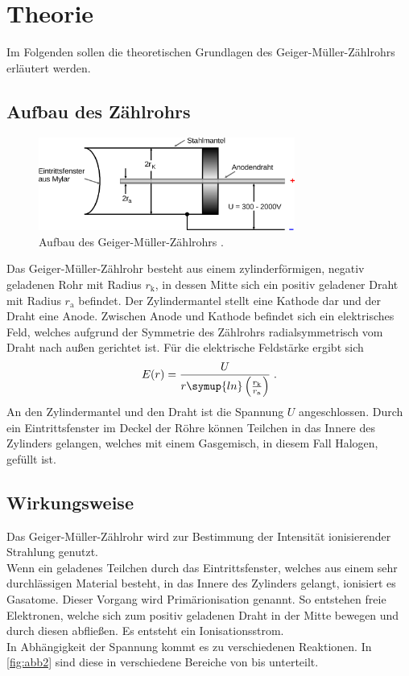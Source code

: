 \section{Theorie} \label{sec:Theorie}

Im Folgenden sollen die theoretischen Grundlagen des Geiger-Müller-Zählrohrs erläutert werden.

\subsection{Aufbau des Zählrohrs}

    \begin{figure}
      \centering
      \includegraphics[width=0.75\textwidth]{content/img/V703_Abb1.jpg}
      \caption{Aufbau des Geiger-Müller-Zählrohrs \cite{versuchsanleitung}.}
      \label{fig:abb1}
    \end{figure}

    Das Geiger-Müller-Zählrohr besteht aus einem zylinderförmigen, negativ geladenen Rohr mit Radius $r_\text{k}$,
    in dessen Mitte sich ein positiv geladener Draht mit Radius $r_\text{a}$ befindet.
    Der Zylindermantel stellt eine Kathode dar und der Draht eine Anode.
    Zwischen Anode und Kathode befindet sich ein elektrisches Feld,
    welches aufgrund der Symmetrie des Zählrohrs radialsymmetrisch vom Draht nach außen gerichtet ist.
    Für die elektrische Feldstärke ergibt sich
    \begin{equation}
        E(r) = \frac{U}{r \symup{ln}\left(\frac{r_\text{k}}{r_\text{a}}\right)} \; .
    \end{equation}
    An den Zylindermantel und den Draht ist die Spannung $U$ angeschlossen.
    Durch ein Eintrittsfenster im Deckel der Röhre können Teilchen in das Innere des Zylinders
    gelangen, welches mit einem Gasgemisch, in diesem Fall Halogen, gefüllt ist.

\subsection{Wirkungsweise}

    Das Geiger-Müller-Zählrohr wird zur Bestimmung der Intensität ionisierender Strahlung genutzt.\\
    Wenn ein geladenes Teilchen durch das Eintrittsfenster,
    welches aus einem sehr durchlässigen Material besteht,
    in das Innere des Zylinders gelangt, ionisiert es Gasatome.
    Dieser Vorgang wird Primärionisation genannt.
    So entstehen freie Elektronen,
    welche sich zum positiv geladenen Draht in der Mitte bewegen und durch diesen abfließen.
    Es entsteht ein Ionisationsstrom. \\
    In Abhängigkeit der Spannung kommt es zu verschiedenen Reaktionen.
    In \autoref{fig:abb2} sind diese in verschiedene Bereiche von  bis  unterteilt.\\

